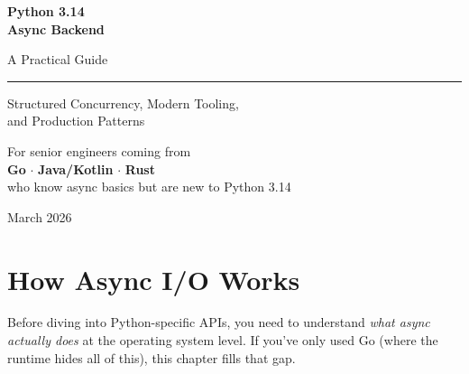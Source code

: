 \documentclass[11pt,a4paper,oneside]{book}
\begin{document}
\begin{titlepage}
\begin{center}
\vspace*{2cm}

{\fontsize{40}{48}\selectfont\bfseries\sffamily\color{chapterbg}
Python 3.14\\[4pt]
Async Backend}

\vspace{0.5cm}

{\fontsize{20}{24}\selectfont\sffamily\color{pyblue}
A Practical Guide}

\vspace{1.5cm}

\rule{0.6\textwidth}{1pt}

\vspace{1.5cm}

{\large\sffamily
Structured Concurrency, Modern Tooling,\\
and Production Patterns}

\vspace{2cm}

\begin{tcolorbox}[
    colback=codebg,
    colframe=pyblue,
    width=0.75\textwidth,
    arc=4pt,
    boxrule=1.5pt,
    halign=center,
]
{\sffamily\small
For senior engineers coming from\\[4pt]
\textcolor{goblue}{\textbf{Go}} $\cdot$
\textcolor{javaorange}{\textbf{Java/Kotlin}} $\cdot$
\textcolor{BrickRed}{\textbf{Rust}}\\[4pt]
who know async basics but are new to Python 3.14}
\end{tcolorbox}

\vfill

{\small\sffamily\color{Gray} March 2026}
\end{center}
\end{titlepage}

\tableofcontents
\newpage

\chapter{How Async I/O Works}

Before diving into Python-specific APIs, you need to understand \emph{what async actually does}
at the operating system level. If you've only used Go (where the runtime hides all of this),
this chapter fills that gap.
\end{document}
